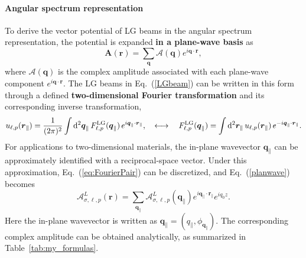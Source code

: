 \paragraph{Angular spectrum representation}
To derive the vector potential of LG beams in the angular spectrum representation, the potential is expanded \textbf{in a plane-wave basis} as
\begin{equation}
\boldsymbol{A}(\boldsymbol{r}) = \sum_{\boldsymbol{q}} \boldsymbol{\mathcal{A}}(\boldsymbol{q}) e^{i \boldsymbol{q} \cdot \boldsymbol{r}}, 
\label{planwave}
\end{equation}
where $\boldsymbol{\mathcal{A}}(\boldsymbol{q})$ is the complex amplitude associated with each plane-wave component $e^{i\boldsymbol{q}\cdot\boldsymbol{r}}$. The LG beams in Eq.~(\ref{LGbeam}) can be written in this form through a defined \textbf{two-dimensional Fourier transformation} and its corresponding inverse transformation,
\begin{equation}
u_{\ell, p}(\boldsymbol{r}_\parallel) = \frac{1}{(2\pi)^2} \int {\rm d}^2 \boldsymbol{q}_\parallel\, 
F^{\rm LG}_{\ell, p}(\boldsymbol{q}_\parallel)\, e^{i\boldsymbol{q}_\parallel\cdot \boldsymbol{r}_\parallel},
\quad \longleftrightarrow \quad
F^{\rm LG}_{\ell, p}(\boldsymbol{q}_\parallel) = \int {\rm d}^2 \boldsymbol{r}_\parallel\, 
u_{\ell, p}(\boldsymbol{r}_\parallel)\, e^{-i \boldsymbol{q}_\parallel\cdot \boldsymbol{r}_\parallel}.
\label{eq:FourierPair}
\end{equation}
For applications to two-dimensional materials, the in-plane wavevector $\boldsymbol{q}_\parallel$ can be approximately identified with a reciprocal-space vector. Under this approximation, Eq.~(\ref{eq:FourierPair}) can be discretized, and Eq.~(\ref{planwave}) becomes
\begin{equation} 
\boldsymbol{\mathcal{A}}^{L}_{\sigma, \ell, p}(\boldsymbol{r})
=
\sum_{\boldsymbol{q}_\parallel}
\boldsymbol{\mathcal{A}}^L_{\sigma, \ell, p}(\boldsymbol{q}_\parallel)
e^{i\boldsymbol{q}_\parallel\cdot \boldsymbol{r}_\parallel}
e^{i q_0 z}.
\end{equation}
Here the in-plane wavevector is written as $\boldsymbol{q}_\parallel=(q_\parallel,\phi_{\boldsymbol{q}_\parallel})$. The corresponding complex amplitude can be obtained analytically, as summarized in Table~\ref{tab:my_formulas}.
